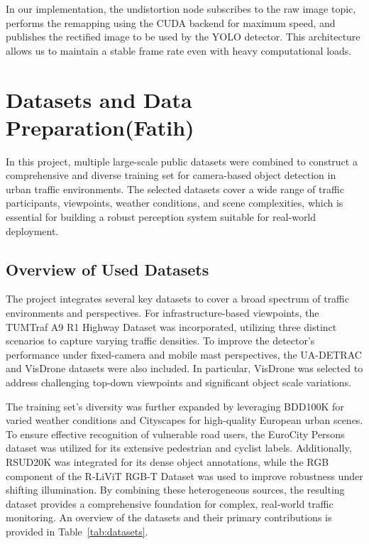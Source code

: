 \documentclass[12pt,a4paper]{report}
\begin{document}
In our implementation, the undistortion node subscribes to the raw image topic, performs the remapping using the CUDA backend for maximum speed, and publishes the rectified image to be used by the YOLO detector. This architecture allows us to maintain a stable frame rate even with heavy computational loads.

\section{Datasets and Data Preparation(Fatih)}
In this project, multiple large-scale public datasets were combined to construct a comprehensive and diverse training set for camera-based object detection in urban traffic environments. The selected datasets cover a wide range of traffic participants, viewpoints, weather conditions, and scene complexities, which is essential for building a robust perception system suitable for real-world deployment.



\subsection{\textbf{Overview of Used Datasets} }
The project integrates several key datasets to cover a broad spectrum of traffic environments and perspectives. For infrastructure-based viewpoints, the TUMTraf A9 R1 Highway Dataset was incorporated, utilizing three distinct scenarios to capture varying traffic densities. To improve the detector’s performance under fixed-camera and mobile mast perspectives, the UA-DETRAC and VisDrone datasets were also included. In particular, VisDrone was selected to address challenging top-down viewpoints and significant object scale variations. 

The training set's diversity was further expanded by leveraging BDD100K for varied weather conditions and Cityscapes for high-quality European urban scenes. To ensure effective recognition of vulnerable road users, the EuroCity Persons dataset was utilized for its extensive pedestrian and cyclist labels. Additionally, RSUD20K was integrated for its dense object annotations, while the RGB component of the R-LiViT RGB-T Dataset was used to improve robustness under shifting illumination. By combining these heterogeneous sources, the resulting dataset provides a comprehensive foundation for complex, real-world traffic monitoring.
An overview of the datasets and their primary contributions is provided in Table~\ref{tab:datasets}.
\end{document}
